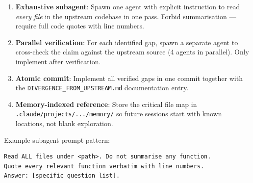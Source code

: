 \documentclass[11pt,a4paper]{article}
\begin{document}
\begin{enumerate}
  \item \textbf{Exhaustive subagent}: Spawn one agent with explicit instruction to
        read \emph{every file} in the upstream codebase in one pass. Forbid
        summarisation --- require full code quotes with line numbers.
  \item \textbf{Parallel verification}: For each identified gap, spawn a separate
        agent to cross-check the claim against the upstream source (4 agents in
        parallel). Only implement after verification.
  \item \textbf{Atomic commit}: Implement all verified gaps in one commit together
        with the \texttt{DIVERGENCE\_FROM\_UPSTREAM.md} documentation entry.
  \item \textbf{Memory-indexed reference}: Store the critical file map in
        \texttt{.claude/projects/.../memory/} so future sessions start with
        known locations, not blank exploration.
\end{enumerate}

\noindent Example subagent prompt pattern:

\begin{verbatim}
Read ALL files under <path>. Do not summarise any function.
Quote every relevant function verbatim with line numbers.
Answer: [specific question list].
\end{verbatim}

\end{document}
